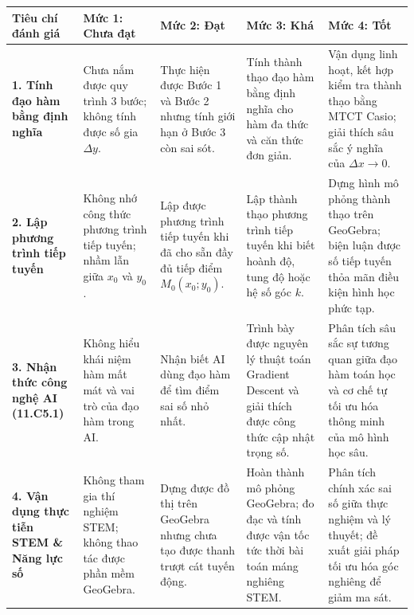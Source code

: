 \documentclass[12pt, a4paper]{article}
\begin{document}
\begin{center}
\small
\begin{tabularx}{\linewidth}{|p{3.2cm}|X|X|X|X|}
\hline
\textbf{Tiêu chí đánh giá} & \textbf{Mức 1: Chưa đạt} & \textbf{Mức 2: Đạt} & \textbf{Mức 3: Khá} & \textbf{Mức 4: Tốt} \\ \hline
\textbf{1. Tính đạo hàm bằng định nghĩa} & Chưa nắm được quy trình 3 bước; không tính được số gia $\Delta y$. & Thực hiện được Bước 1 và Bước 2 nhưng tính giới hạn ở Bước 3 còn sai sót. & Tính thành thạo đạo hàm bằng định nghĩa cho hàm đa thức và căn thức đơn giản. & Vận dụng linh hoạt, kết hợp kiểm tra thành thạo bằng MTCT Casio; giải thích sâu sắc ý nghĩa của $\Delta x \to 0$. \\ \hline
\textbf{2. Lập phương trình tiếp tuyến} & Không nhớ công thức phương trình tiếp tuyến; nhầm lẫn giữa $x_0$ và $y_0$. & Lập được phương trình tiếp tuyến khi đã cho sẵn đầy đủ tiếp điểm $M_0(x_0; y_0)$. & Lập thành thạo phương trình tiếp tuyến khi biết hoành độ, tung độ hoặc hệ số góc $k$. & Dựng hình mô phỏng thành thạo trên GeoGebra; biện luận được số tiếp tuyến thỏa mãn điều kiện hình học phức tạp. \\ \hline
\textbf{3. Nhận thức công nghệ AI (11.C5.1)} & Không hiểu khái niệm hàm mất mát và vai trò của đạo hàm trong AI. & Nhận biết AI dùng đạo hàm để tìm điểm sai số nhỏ nhất. & Trình bày được nguyên lý thuật toán Gradient Descent và giải thích được công thức cập nhật trọng số. & Phân tích sâu sắc sự tương quan giữa đạo hàm toán học và cơ chế tự tối ưu hóa thông minh của mô hình học sâu. \\ \hline
\textbf{4. Vận dụng thực tiễn STEM \& Năng lực số} & Không tham gia thí nghiệm STEM; không thao tác được phần mềm GeoGebra. & Dựng được đồ thị trên GeoGebra nhưng chưa tạo được thanh trượt cát tuyến động. & Hoàn thành mô phỏng GeoGebra; đo đạc và tính được vận tốc tức thời bài toán máng nghiêng STEM. & Phân tích chính xác sai số giữa thực nghiệm và lý thuyết; đề xuất giải pháp tối ưu hóa góc nghiêng để giảm ma sát. \\ \hline
\end{tabularx}
\end{center}
\end{document}
